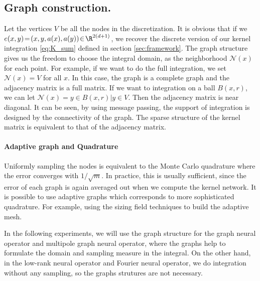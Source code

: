 \subsection{Graph construction.} 
Let the vertices $V$ be all the nodes in the discretization.
It is obvious that if we $e(x,y) \!=\! (x,y,a(x),a(y)) \!\in \!\R^{2(d+1)}$, we recover the discrete version of our kernel integration \ref{eq:K_sum} defined in section \ref{sec:framework}. 
The graph structure gives us the freedom to choose the integral domain, as the neighborhood $\mathcal{N}(x)$ for each point. For example, if we want to do the full integration, we set $\mathcal{N}(x) = V$ for all $x$. In this case, the graph is a complete graph and the adjacency matrix is a full matrix. If we want to integration on a ball $B(x,r)$, we can let $\mathcal{N}(x) = {y \in B(x,r)| y \in V}$. Then the adjacency matrix is near diagonal. It can be seen, by using message passing, the support of integration is designed by the connectivity of the graph. The sparse structure of the kernel matrix is equivalent to that of the adjacency matrix.

\paragraph{Adaptive graph and Quadrature}
Uniformly sampling the nodes is equivalent to the Monte Carlo quadrature where the error converges with $1/\sqrt{m}$. In practice, this is usually sufficient, since the error of each graph is again averaged out when we compute the kernel network. It is possible to use adaptive graphs which corresponds to more sophisticated quadrature. For example,  \cite{pfaff2020learning} using the sizing field techniques to build the adaptive mesh.


In the following experiments, we will use the graph structure for the graph neural operator and multipole graph neural operator, where the graphs help to formulate the domain and sampling measure in the integral. On the other hand, in the low-rank neural operator and Fourier neural operator, we do integration without any sampling, so the graphs strutures are not necessary.
